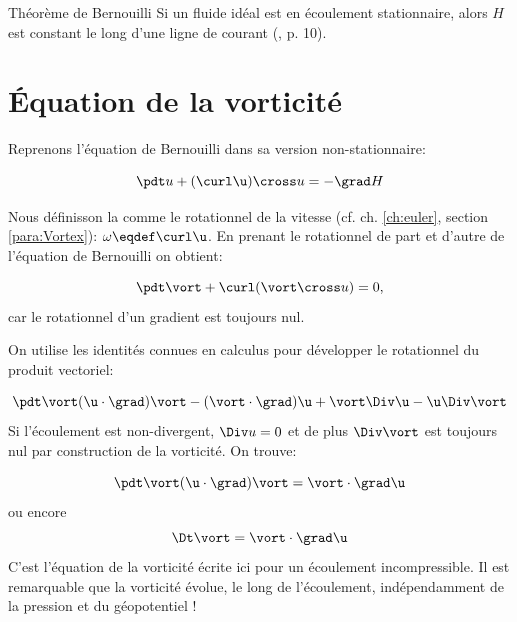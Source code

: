 \begin{key}{Théorème de Bernouilli}
  Si un fluide idéal est en écoulement stationnaire, alors $H$ est constant le long d'une ligne de courant (\cite{acheson01aa}, p. 10).
\end{key}

\section{Équation de la vorticité}

Reprenons l'équation de Bernouilli dans sa version non-stationnaire: 

\begin{equation}
 \pdt u +  (\curl \u)\cross u = - \grad H
\end{equation}

Nous définisson la  comme le rotationnel de la vitesse (cf. ch. \ref{ch:euler}, section \ref{para:Vortex}): $\omega \eqdef \curl \u$. En prenant le rotationnel de part et d'autre de l'équation de Bernouilli  on obtient: 

\begin{equation}
 \pdt \vort +  \curl (\vort \cross u) = 0, 
\end{equation}
%
car le rotationnel d'un gradient est toujours nul. 

On utilise les identités connues en calculus pour développer le rotationnel du produit vectoriel: 

\begin{equation}
 \pdt \vort (\u\cdot \grad)\vort - (\vort\cdot\grad)\u + \vort\Div \u - \u \Div \vort
\end{equation}
%
Si l'écoulement est non-divergent, $\Div u=0$ et de plus $\Div \vort$ est toujours nul par construction de la vorticité. On trouve: 

\begin{equation*}
 \pdt \vort (\u\cdot \grad)\vort = \vort \cdot \grad \u
\end{equation*}
%
ou encore
\begin{equation}
 \Dt\vort = \vort \cdot \grad \u
\label{eq:vort}
\end{equation}
%
C'est l'équation de la vorticité écrite ici pour un écoulement incompressible. Il est remarquable que la vorticité évolue, le long de l'écoulement, indépendamment de la pression et du géopotentiel ! 


